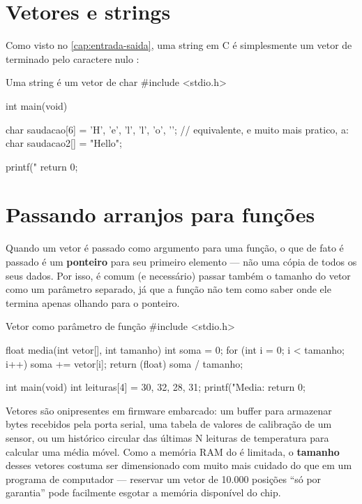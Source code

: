 \section{Vetores e strings}

Como visto no \cref{cap:entrada-saida}, uma string em C é simplesmente um vetor de  terminado pelo caractere nulo :

\begin{codigoc}{Uma string é um vetor de char}
#include <stdio.h>

int main(void) {
    char saudacao[6] = {'H', 'e', 'l', 'l', 'o', '\0'};
    // equivalente, e muito mais pratico, a:
    char saudacao2[] = "Hello";

    printf("%
    return 0;
}
\end{codigoc}

\section{Passando arranjos para funções}

Quando um vetor é passado como argumento para uma função, o que de fato é passado é um \textbf{ponteiro} para seu primeiro elemento — não uma cópia de todos os seus dados. Por isso, é comum (e necessário) passar também o tamanho do vetor como um parâmetro separado, já que a função não tem como saber onde ele termina apenas olhando para o ponteiro.

\begin{codigoc}{Vetor como parâmetro de função}
#include <stdio.h>

float media(int vetor[], int tamanho) {
    int soma = 0;
    for (int i = 0; i < tamanho; i++) {
        soma += vetor[i];
    }
    return (float) soma / tamanho;
}

int main(void) {
    int leituras[4] = {30, 32, 28, 31};
    printf("Media: %
    return 0;
}
\end{codigoc}

\begin{esp32box}
Vetores são onipresentes em firmware embarcado: um buffer para armazenar bytes recebidos pela porta serial, uma tabela de valores de calibração de um sensor, ou um histórico circular das últimas N leituras de temperatura para calcular uma média móvel. Como a memória RAM do \ESP{} é limitada, o \textbf{tamanho} desses vetores costuma ser dimensionado com muito mais cuidado do que em um programa de computador — reservar um vetor de 10.000 posições ``só por garantia'' pode facilmente esgotar a memória disponível do chip.
\end{esp32box}
